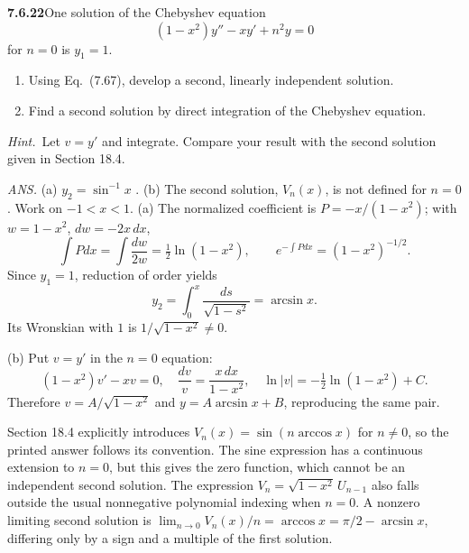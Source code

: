 \par\bigskip
\noindent\textbf{7.6.22}\quad One solution of the Chebyshev equation
\[
(1-x^{2})y''-xy'+n^{2}y=0
\]
for $n=0$ is $y_{1}=1$.
\begin{enumerate}
\item[(a)] Using Eq.~(7.67), develop a second, linearly independent solution.
\item[(b)] Find a second solution by direct integration of the Chebyshev
  equation.
\end{enumerate}
\emph{Hint.}~Let $v=y'$ and integrate. Compare your result with the second
solution given in Section 18.4.
\par\nobreak\hfill\emph{ANS.}\enspace
(a) $y_{2}=\sin^{-1}x$ .\quad
(b) The second solution, $V_n(x)$, is not defined for $n=0$
.
\solution
Work on $-1<x<1$. (a) The normalized coefficient is
$P=-x/(1-x^2)$; with $w=1-x^2$, $dw=-2x\,dx$,
\[
\int Pdx=\int\frac{dw}{2w}=\tfrac12\ln(1-x^2),\qquad
e^{-\int Pdx}=(1-x^2)^{-1/2}.
\]
Since $y_1=1$, reduction of order yields
\[
\boxed{y_2=\int_0^x\frac{ds}{\sqrt{1-s^2}}=\arcsin x}.
\]
Its Wronskian with $1$ is $1/\sqrt{1-x^2}\ne0$.

(b) Put $v=y'$ in the $n=0$ equation:
\[
(1-x^2)v'-xv=0,\quad
\frac{dv}{v}=\frac{x\,dx}{1-x^2},\quad
\ln|v|=-\tfrac12\ln(1-x^2)+C.
\]
Therefore $v=A/\sqrt{1-x^2}$ and
$\boxed{y=A\arcsin x+B}$, reproducing the same pair.

Section 18.4 explicitly introduces $V_n(x)=\sin(n\arccos x)$ for
$n\ne0$, so the printed answer follows its convention. The sine expression
has a continuous extension to $n=0$, but this gives the zero function,
which cannot be an independent second solution. The expression
$V_n=\sqrt{1-x^2}\,U_{n-1}$ also falls outside the usual nonnegative
polynomial indexing when $n=0$.
A nonzero limiting second solution is
$\lim_{n\to0}V_n(x)/n=\arccos x=\pi/2-\arcsin x$, differing only
by a sign and a multiple of the first solution.

